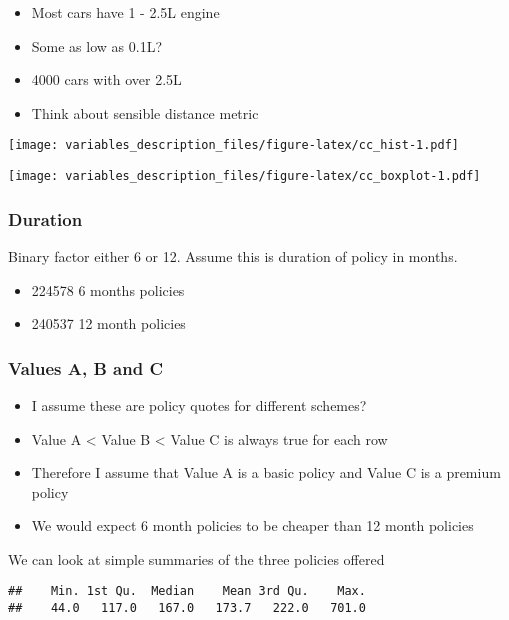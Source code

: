 \documentclass[]{article}
\providecommand{\tightlist}{%
  \setlength{\itemsep}{0pt}\setlength{\parskip}{0pt}}
\begin{document}
\begin{itemize}
\tightlist
\item
  Most cars have 1 - 2.5L engine
\item
  Some as low as 0.1L?
\item
  4000 cars with over 2.5L
\item
  Think about sensible distance metric
\end{itemize}

\texttt{[image: variables\_description\_files/figure-latex/cc\_hist-1.pdf]}

\texttt{[image: variables\_description\_files/figure-latex/cc\_boxplot-1.pdf]}

\subsubsection{Duration}\label{duration}

Binary factor either 6 or 12. Assume this is duration of policy in
months.

\begin{itemize}
\tightlist
\item
  224578 6 months policies
\item
  240537 12 month policies
\end{itemize}

\subsubsection{Values A, B and C}\label{values-a-b-and-c}

\begin{itemize}
\tightlist
\item
  I assume these are policy quotes for different schemes?
\item
  Value A \textless{} Value B \textless{} Value C is always true for
  each row
\item
  Therefore I assume that Value A is a basic policy and Value C is a
  premium policy
\item
  We would expect 6 month policies to be cheaper than 12 month policies
\end{itemize}

We can look at simple summaries of the three policies offered

\begin{verbatim}
##    Min. 1st Qu.  Median    Mean 3rd Qu.    Max. 
##    44.0   117.0   167.0   173.7   222.0   701.0
\end{verbatim}
\end{document}
